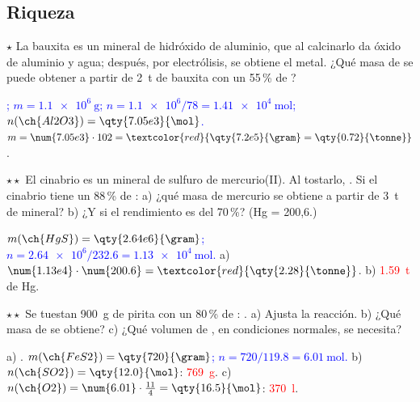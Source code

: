 \subsection{Riqueza}

\begin{exercise}
    \(\star\) La bauxita es un mineral de hidróxido de aluminio, que al calcinarlo da óxido de aluminio y agua; después, por
    electrólisis, se obtiene el metal. ¿Qué masa de  se puede obtener a partir de \qty{2}{\tonne} de bauxita con un
    55\,\% de ?
    \begin{solu}
        \textcolor{blue}{; \(m = \qty{1.1e6}{\gram}\); \(n = \num{1.1e6}/78 = \qty{1.41e4}{\mol}\);
        \(n(\ch{Al2O3}) = \qty{7.05e3}{\mol}\).} \(m = \num{7.05e3} \cdot 102 = \textcolor{red}{\qty{7.2e5}{\gram} = \qty{0.72}{\tonne}}\).
    \end{solu}
\end{exercise}

\begin{exercise}
    \(\star\star\) El cinabrio es un mineral de sulfuro de mercurio(II). Al tostarlo, .
    Si el cinabrio tiene un 88\,\% de : a) ¿qué masa de mercurio se obtiene a partir de \qty{3}{\tonne} de mineral? b) ¿Y si
    el rendimiento es del 70\,\%? (Hg = 200,6.)
    \begin{solu}
        \textcolor{blue}{\(m(\ch{HgS}) = \qty{2.64e6}{\gram}\); \(n = \num{2.64e6}/\num{232.6} = \qty{1.13e4}{\mol}\).}
        a) \(\num{1.13e4} \cdot \num{200.6} = \textcolor{red}{\qty{2.28}{\tonne}}\). b) \textcolor{red}{\qty{1.59}{\tonne}} de Hg.
    \end{solu}
\end{exercise}

\begin{exercise}
    \(\star\star\) Se tuestan \qty{900}{\gram} de pirita con un 80\,\% de : . a) Ajusta la
    reacción. b) ¿Qué masa de  se obtiene? c) ¿Qué volumen de , en condiciones normales, se necesita?
    \begin{solu}
        a) \textcolor{red}{}. \textcolor{blue}{\(m(\ch{FeS2}) = \qty{720}{\gram}\);
        \(n = 720/\num{119.8} = \qty{6.01}{\mol}\).} b) \(n(\ch{SO2}) = \qty{12.0}{\mol}\): \textcolor{red}{\qty{769}{\gram}}.
        c) \(n(\ch{O2}) = \num{6.01} \cdot \frac{11}{4} = \qty{16.5}{\mol}\): \textcolor{red}{\qty{370}{\litre}}.
    \end{solu}
\end{exercise}


